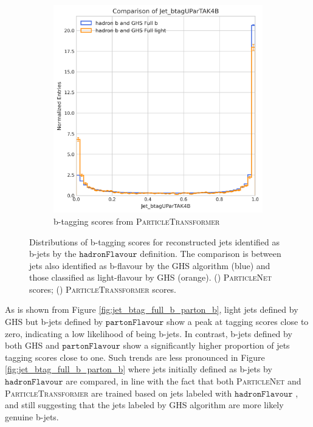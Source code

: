 \documentclass[10pt,twocolumn]{article}
\newcommand*{\parFlav}{\texttt{partonFlavour}}
\newcommand*{\hadFlav}{\texttt{hadronFlavour}}
\begin{document}
\begin{figure}[!htbp]
\begin{subfigure}[t]{0.48\textwidth}
        \includegraphics[width=\textwidth]{images/compare_btagUParTAK4B_GHSFull_light_vs_b_filter_hadronFlavour_5.png}
        \caption{b-tagging scores from \textsc{ParticleTransformer}}
        \label{fig:jet_btagParT_full_b_hadron_b}
    \end{subfigure}
    \caption{Distributions of b-tagging scores for reconstructed jets identified as b-jets by the $\hadFlav$ definition. The comparison is between jets also identified as b-flavour by the GHS algorithm (blue) and those classified as light-flavour by GHS (orange). () \textsc{ParticleNet} scores; () \textsc{ParticleTransformer} scores.}
    \label{fig:jet_btag_full_b_hadron_b}
\end{figure}

As is shown from Figure \ref{fig:jet_btag_full_b_parton_b}, light jets defined by GHS but b-jets defined by $\parFlav$ show a peak at tagging scores close to zero, indicating a low likelihood of being b-jets. In contrast, b-jets defined by both GHS and $\parFlav$ show a significantly higher proportion of jets tagging scores close to one. Such trends are less pronounced in Figure \ref{fig:jet_btag_full_b_parton_b} where jets initially defined as b-jets by $\hadFlav$ are compared, in line with the fact that both \textsc{ParticleNet} and \textsc{ParticleTransformer} are trained based on jets labeled with $\hadFlav$ \cite{CMS-PAS-BTV-22-001}, and still suggesting that the jets labeled by GHS algorithm are more likely genuine b-jets.
\end{document}

